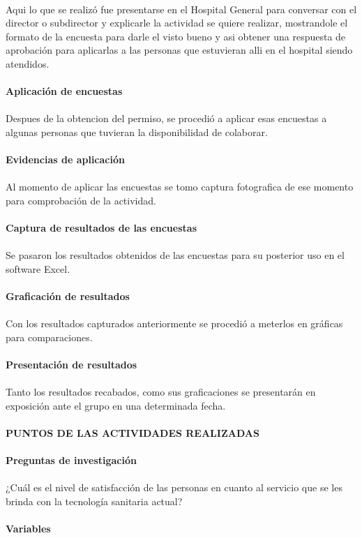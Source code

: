 \documentclass [a4paper, 12pt]{report}
\begin{document}
\\
Aqui lo que se realizó fue presentarse en el Hospital General para conversar con el director o subdirector y explicarle la actividad se quiere realizar, mostrandole el formato de la encuesta para darle el visto bueno y asi obtener una respuesta de aprobación para aplicarlas a las personas que estuvieran alli en el hospital siendo atendidos. \\
\\
\textbf{Aplicación de encuestas}        \\ 
\\
Despues de la obtencion del permiso, se procedió a aplicar esas encuestas a algunas personas que tuvieran la disponibilidad de colaborar.  \\
\\
\textbf{Evidencias de aplicación}     \\ 
\\
Al momento de aplicar las encuestas se tomo captura fotografica de ese momento para comprobación de la actividad. \\
\\
\textbf{Captura de resultados de las encuestas} \\
\\
Se pasaron los resultados obtenidos de las encuestas para su posterior uso en el software Excel. \\
\\
\textbf{Graficación de resultados}     \\
\\
Con los resultados capturados anteriormente se procedió a meterlos en gráficas para comparaciones. \\
\\
\textbf{Presentación de resultados} \\
\\
Tanto los resultados recabados, como sus graficaciones se presentarán en exposición ante el grupo en una determinada fecha. \\
\\
\textbf{PUNTOS DE LAS ACTIVIDADES REALIZADAS} \\
\\
\textbf{Preguntas de investigación} \\
 \\
¿Cuál es el nivel de satisfacción de las personas en cuanto al servicio que se les brinda con la tecnología sanitaria actual? \\
 \\
\textbf{Variables} \\
\end{document}

